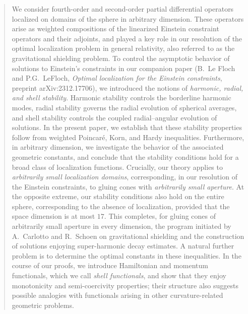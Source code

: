 \documentclass[11pt]{article}
\numberwithin{table}{section}
\numberwithin{equation}{section}
\numberwithin{table}{section}
\numberwithin{figure}{section}
\begin{document}
\begin{abstract}
We consider fourth-order and second-order partial differential operators localized on domains of the sphere in arbitrary dimension. These operators arise as weighted compositions of the linearized Einstein constraint operators and their adjoints, and played a key role in our resolution of the optimal localization problem in general relativity, also referred to as the gravitational shielding problem. To control the asymptotic behavior of solutions to Einstein's constraints in our companion paper (B.~Le Floch and P.G.~LeFloch, \emph{Optimal localization for the Einstein constraints}, preprint arXiv:2312.17706), we introduced the notions of \emph{harmonic, radial, and shell stability}. Harmonic stability controls the borderline harmonic modes, radial stability governs the radial evolution of spherical averages, and shell stability controls the coupled radial--angular evolution of solutions. In the present paper, we establish that these stability properties follow from weighted Poincar\'e, Korn, and Hardy inequalities. Furthermore, in arbitrary dimension, we investigate the behavior of the associated geometric constants, and conclude that the stability conditions hold for a broad class of localization functions. Crucially, our theory applies to \emph{arbitrarily small localization domains}, corresponding, in our resolution of the Einstein constraints, to gluing cones with \emph{arbitrarily small aperture}. At the opposite extreme, our stability conditions also hold on the entire sphere, corresponding to the absence of localization, provided that the space dimension is at most \(17\). This completes, for gluing cones of arbitrarily small aperture in every dimension, the program initiated by A.~Carlotto and R.~Schoen on gravitational shielding and the construction of solutions enjoying super-harmonic decay estimates. A natural further problem is to determine the optimal constants in these inequalities.
In the course of our proofs, we introduce Hamiltonian and momentum functionals, which we call \emph{shell functionals}, and show that they enjoy monotonicity and semi-coercivity properties; their structure also suggests possible analogies with functionals arising in other curvature-related geometric problems.
\end{abstract}
 


\clearpage 

{\small

\setcounter{secnumdepth}{2} 
\setcounter{tocdepth}{2}
\tableofcontents

} 
\end{document}
